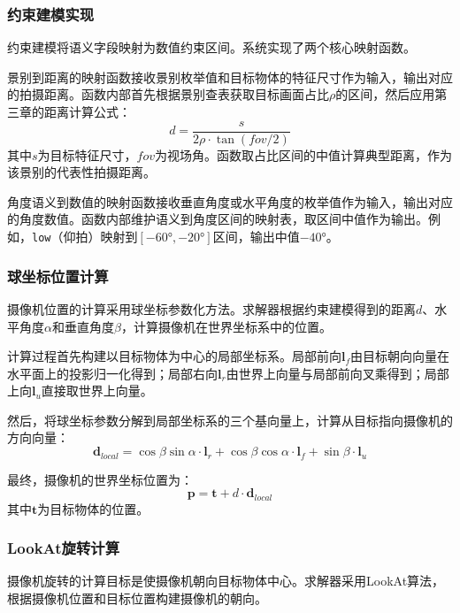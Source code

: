 \subsubsection{约束建模实现}

约束建模将语义字段映射为数值约束区间。系统实现了两个核心映射函数。

景别到距离的映射函数接收景别枚举值和目标物体的特征尺寸作为输入，输出对应的拍摄距离。函数内部首先根据景别查表获取目标画面占比$\rho$的区间，然后应用第三章的距离计算公式：
\begin{equation}
d = \frac{s}{2\rho \cdot \tan(\textit{fov}/2)}
\end{equation}
其中$s$为目标特征尺寸，$\textit{fov}$为视场角。函数取占比区间的中值计算典型距离，作为该景别的代表性拍摄距离。

角度语义到数值的映射函数接收垂直角度或水平角度的枚举值作为输入，输出对应的角度数值。函数内部维护语义到角度区间的映射表，取区间中值作为输出。例如，\texttt{low}（仰拍）映射到$[-60°, -20°]$区间，输出中值$-40°$。

\subsubsection{球坐标位置计算}

摄像机位置的计算采用球坐标参数化方法。求解器根据约束建模得到的距离$d$、水平角度$\alpha$和垂直角度$\beta$，计算摄像机在世界坐标系中的位置。

计算过程首先构建以目标物体为中心的局部坐标系。局部前向$\mathbf{l}_f$由目标朝向向量在水平面上的投影归一化得到；局部右向$\mathbf{l}_r$由世界上向量与局部前向叉乘得到；局部上向$\mathbf{l}_u$直接取世界上向量。

然后，将球坐标参数分解到局部坐标系的三个基向量上，计算从目标指向摄像机的方向向量：
\begin{equation}
\mathbf{d}_{local} = \cos\beta \sin\alpha \cdot \mathbf{l}_r + \cos\beta \cos\alpha \cdot \mathbf{l}_f + \sin\beta \cdot \mathbf{l}_u
\end{equation}

最终，摄像机的世界坐标位置为：
\begin{equation}
\mathbf{p} = \mathbf{t} + d \cdot \mathbf{d}_{local}
\end{equation}
其中$\mathbf{t}$为目标物体的位置。

\subsubsection{LookAt旋转计算}

摄像机旋转的计算目标是使摄像机朝向目标物体中心。求解器采用LookAt算法，根据摄像机位置和目标位置构建摄像机的朝向。

